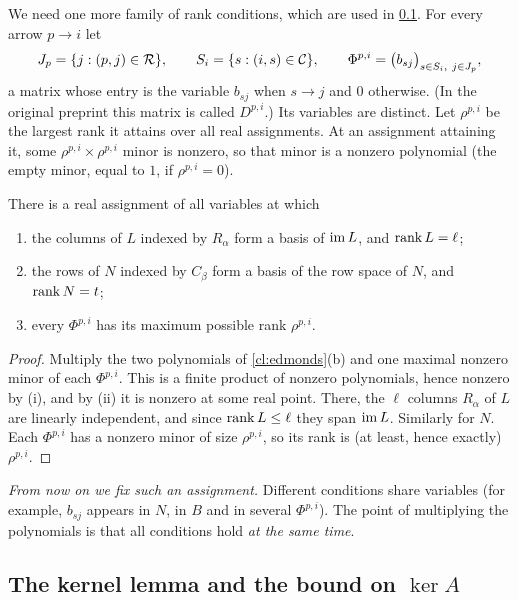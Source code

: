 We need one more family of rank conditions, which are used in
\cref{sec:kernel}. For every arrow $p\to i$ let
\[
 J_p=\{j:(p,j)\in\mathcal R\},\qquad S_i=\{s:(i,s)\in\mathcal C\},\qquad
 \Phi^{p,i}=\bigl(b_{sj}\bigr)_{s\in S_i,\ j\in J_p},
\]
a matrix whose entry is the variable $b_{sj}$ when $s\to j$ and $0$
otherwise. (In the original preprint this matrix is called $D^{p,i}$.) Its
variables are distinct. Let $\rho^{p,i}$ be the largest rank it attains over
all real assignments. At an assignment attaining it, some
$\rho^{p,i}\times\rho^{p,i}$ minor is nonzero, so that minor is a nonzero
polynomial (the empty minor, equal to $1$, if $\rho^{p,i}=0$).

\begin{claim}\label{cl:simultaneous}
There is a real assignment of all variables at which
\begin{enumerate}[label=(\alph*)]
\item the columns of $L$ indexed by $R_\alpha$ form a basis of $\operatorname{im} L$, and $\operatorname{rank} L=\ell$;
\item the rows of $N$ indexed by $C_\beta$ form a basis of the row space of $N$, and $\operatorname{rank} N=t$;
\item every $\Phi^{p,i}$ has its maximum possible rank $\rho^{p,i}$.
\end{enumerate}
\end{claim}

\begin{proof}
Multiply the two polynomials of \cref{cl:edmonds}(b) and one maximal nonzero
minor of each $\Phi^{p,i}$. This is a finite product of nonzero polynomials,
hence nonzero by (i), and by (ii) it is nonzero at some real point. There, the
$\ell$ columns $R_\alpha$ of $L$ are linearly independent, and since
$\operatorname{rank} L\le\ell$ they span $\operatorname{im} L$. Similarly for $N$. Each $\Phi^{p,i}$ has a
nonzero minor of size $\rho^{p,i}$, so its rank is (at least, hence exactly)
$\rho^{p,i}$.
\end{proof}

\emph{From now on we fix such an assignment.} Different conditions share
variables (for example, $b_{sj}$ appears in $N$, in $B$ and in several
$\Phi^{p,i}$). The point of multiplying the polynomials is that all
conditions hold \emph{at the same time}.

\subsection{The kernel lemma and the bound on \texorpdfstring{$\ker A$}{ker A}}\label{sec:kernel}


